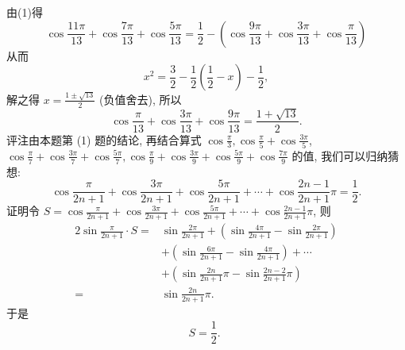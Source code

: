 由(1)得
$$
\cos \frac{11 \pi}{13}+\cos \frac{7 \pi}{13}+\cos \frac{5 \pi}{13}=\frac{1}{2}-\left(\cos \frac{9 \pi}{13}+\cos \frac{3 \pi}{13}+\cos \frac{\pi}{13}\right)
$$
从而
$$
x^2=\frac{3}{2}-\frac{1}{2}\left(\frac{1}{2}-x\right)-\frac{1}{2},
$$
解之得 $x=\frac{1 \pm \sqrt{13}}{2}$ (负值舍去), 所以
$$
\cos \frac{\pi}{13}+\cos \frac{3 \pi}{13}+\cos \frac{9 \pi}{13}=\frac{1+\sqrt{13}}{2} .
$$
评注由本题第 (1) 题的结论, 再结合算式 $\cos \frac{\pi}{3}, \cos \frac{\pi}{5}+\cos \frac{3 \pi}{5}$, $\cos \frac{\pi}{7}+\cos \frac{3 \pi}{7}+\cos \frac{5 \pi}{7}, \cos \frac{\pi}{9}+\cos \frac{3 \pi}{9}+\cos \frac{5 \pi}{9}+\cos \frac{7 \pi}{9}$ 的值, 我们可以归纳猜想:
$$
\cos \frac{\pi}{2 n+1}+\cos \frac{3 \pi}{2 n+1}+\cos \frac{5 \pi}{2 n+1}+\cdots+\cos \frac{2 n-1}{2 n+1} \pi=\frac{1}{2} .
$$
证明令 $S=\cos \frac{\pi}{2 n+1}+\cos \frac{3 \pi}{2 n+1}+\cos \frac{5 \pi}{2 n+1}+\cdots+\cos \frac{2 n-1}{2 n+1} \pi$,
则
$$
\begin{aligned}
2 \sin \frac{\pi}{2 n+1} \cdot S= & \sin \frac{2 \pi}{2 n+1}+\left(\sin \frac{4 \pi}{2 n+1}-\sin \frac{2 \pi}{2 n+1}\right) \\
& +\left(\sin \frac{6 \pi}{2 n+1}-\sin \frac{4 \pi}{2 n+1}\right)+\cdots \\
& +\left(\sin \frac{2 n}{2 n+1} \pi-\sin \frac{2 n-2}{2 n+1} \pi\right) \\
= & \sin \frac{2 n}{2 n+1} \pi .
\end{aligned}
$$
于是
$$
S=\frac{1}{2} \text {. }
$$


